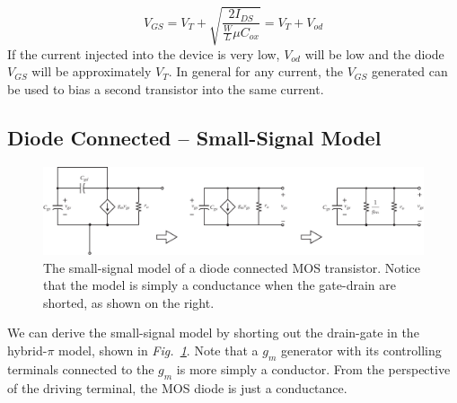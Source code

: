     \begin{equation}
        V_{GS} = V_T + \sqrt{\frac{2 I_{DS}}{\frac{W}{L} \mu C_{ox}}} = V_T + V_{od}
    \end{equation}
If the current injected into the device is very low, $V_{od}$ will be low and the diode $V_{GS}$ will be approximately $V_T$.  In general for any current, the $V_{GS}$ generated can be used to bias a second transistor into the same current. 
\subsection{Diode Connected -- Small-Signal Model}
\begin{figure}[tb]
\centering
\includegraphics[width=\columnwidth]{4mos_diode_ss.pdf}
\caption{The small-signal model of a diode connected MOS transistor.  Notice that the model is simply a conductance when the gate-drain are shorted, as shown on the right.}
\label{fig:4mos_diode_ss.pdf}
\end{figure}
We can derive the small-signal model by shorting out the drain-gate in the hybrid-$\pi$ model, shown in \emph{Fig.~\ref{fig:4mos_diode_ss.pdf}}.  Note that a $g_m$ generator with its controlling terminals connected to the $g_m$ is more simply a conductor.  From the perspective of the driving terminal, the MOS diode is just a conductance.
